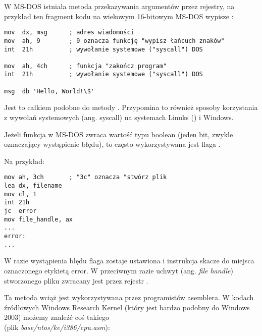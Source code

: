 
W MS-DOS istniała metoda przekazywania argumentów przez rejestry, na przykład ten fragment kodu na wiekowym 16-bitowym MS-DOS
wypisze :

\begin{lstlisting}[style=customasmx86]
mov  dx, msg      ; adres wiadomości
mov  ah, 9        ; 9 oznacza funkcję "wypisz łańcuch znaków"
int  21h          ; wywołanie systemowe ("syscall") DOS

mov  ah, 4ch      ; funkcja "zakończ program"
int  21h          ; wywołanie systemowe ("syscall") DOS

msg  db 'Hello, World!\$'
\end{lstlisting}

Jest to całkiem podobne do metody .
Przypomina to również sposoby korzystania z wywołań systemowych (ang. syscall) na systemach Linuks () i Windows.

Jeżeli funkcja w MS-DOS zwraca wartość typu boolean (jeden bit, zwykle oznaczający wystąpienie błędu), to często wykorzystywana jest flaga .

Na przykład:

\begin{lstlisting}[style=customasmx86]
mov ah, 3ch       ; "3c" oznacza "stwórz plik
lea dx, filename
mov cl, 1
int 21h
jc  error
mov file_handle, ax
...
error:
...
\end{lstlisting}

W razie wystąpienia błędu flaga  zostaje ustawiona i instrukcja  skacze do miejsca oznaczonego etykietą error. W przeciwnym razie uchwyt (ang. \emph{file handle}) stworzonego pliku zwracany jest przez rejestr .

Ta metoda wciąż jest wykorzystywana przez programistów asemblera.
W kodach źródłowych Windows Research Kernel (który jest bardzo podobny do Windows 2003) możemy znaleźć coś takiego\\
(plik \emph{base/ntos/ke/i386/cpu.asm}):

